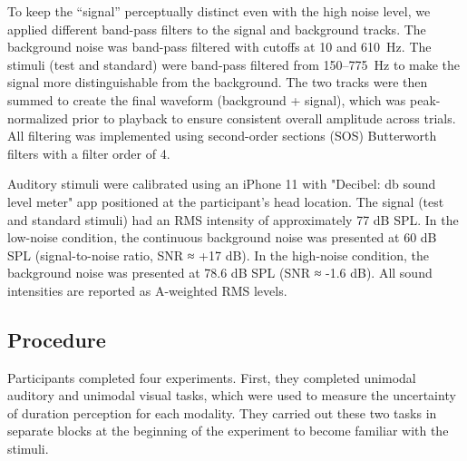 \documentclass[9pt,lineno,doublespacing]{elife}
\begin{document}
To keep the “signal” perceptually distinct even with the high noise level, we applied different band-pass filters to the signal and background tracks. The background noise was band-pass filtered with cutoffs at 10 and 610~Hz. The stimuli (test and standard) were band-pass filtered from 150–775~Hz to make the signal more distinguishable from the background. The two tracks were then summed to create the final waveform (background + signal), which was peak-normalized prior to playback to ensure consistent overall amplitude across trials. All filtering was implemented using second-order sections (SOS) Butterworth filters with a filter order of 4.

Auditory stimuli were calibrated using an iPhone 11 with "Decibel: db sound level meter" app positioned at the participant's head location. The signal (test and standard stimuli) had an RMS intensity of approximately 77 dB SPL. In the low-noise condition, the continuous background noise was presented at 60 dB SPL (signal-to-noise ratio, SNR ≈ +17 dB). In the high-noise condition, the background noise was presented at 78.6 dB SPL (SNR ≈ -1.6 dB). All sound intensities are reported as A-weighted RMS levels.





\subsection{Procedure}
Participants completed four experiments. First, they completed unimodal auditory and unimodal visual tasks, which were used to measure the uncertainty of duration perception for each modality. They carried out these two tasks in separate blocks at the beginning of the experiment to become familiar with the stimuli. 
\end{document}
